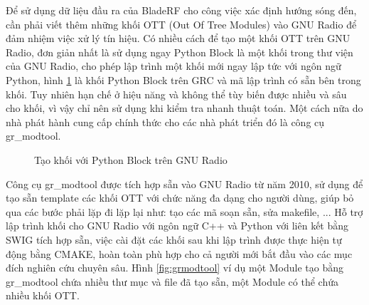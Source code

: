 Để sử dụng dữ liệu đầu ra của BladeRF cho công việc xác định hướng sóng đến, cần phải viết thêm những khối OTT (Out Of Tree Modules) vào GNU Radio để đảm nhiệm việc xử lý tín hiệu. Có nhiều cách để tạo một khối OTT trên GNU Radio, đơn giản nhất là sử dụng ngay Python Block là một khối trong thư viện của GNU Radio, cho phép lập trình một khối mới ngay lập tức với ngôn ngữ Python, hình \ref{fig:pythonblock} là khối Python Block trên GRC và mã lập trình có sẵn bên trong khối. Tuy nhiên hạn chế ở hiệu năng và không thể tùy biến được nhiều và sâu cho khối, vì vậy chỉ nên sử dụng khi kiểm tra nhanh thuật toán. Một cách nữa do nhà phát hành cung cấp chính thức cho các nhà phát triển đó là công cụ gr\_modtool.
\newpage
\begin{figure}[!htb]
{}
\hfill
{}
\hfill
\caption{Tạo khối với Python Block trên GNU Radio}
\label{fig:pythonblock}
\end{figure}

Công cụ gr\_modtool được tích hợp sẵn vào GNU Radio từ năm 2010, sử dụng để tạo sẵn template các khối OTT với chức năng đa dạng cho người dùng, giúp bỏ qua các bước phải lặp đi lặp lại như: tạo các mã soạn sẵn, sửa makefile, ... Hỗ trợ lập trình khối cho GNU Radio với ngôn ngữ C++ và Python với liên kết bằng SWIG tích hợp sẵn, việc cài đặt các khối sau khi lập trình được thực  hiện tự động bằng CMAKE, hoàn toàn phù hợp cho cả người mới bắt đầu vào các mục đích nghiên cứu chuyên sâu. Hình \ref{fig:grmodtool} ví dụ một Module tạo bằng gr\_modtool chứa nhiều thư mục và file đã tạo sẵn, một Module có thể chứa nhiều khối OTT.

